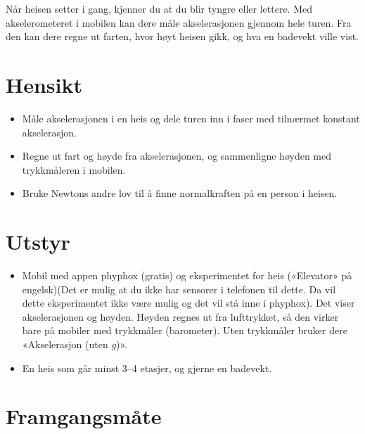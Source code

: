 \documentclass[11pt]{article}
\begin{document}

Når heisen setter i gang, kjenner du at du blir tyngre eller lettere. Med akselerometeret i mobilen kan dere måle akselerasjonen gjennom hele turen. Fra den kan dere regne ut farten, hvor høyt heisen gikk, og hva en badevekt ville vist.

\section*{Hensikt}

\begin{itemize}
\item Måle akselerasjonen i en heis og dele turen inn i faser med tilnærmet konstant akselerasjon.
\item Regne ut fart og høyde fra akselerasjonen, og sammenligne høyden med trykkmåleren i mobilen.
\item Bruke Newtons andre lov til å finne normalkraften på en person i heisen.
\end{itemize}

\section*{Utstyr}

\begin{itemize}
\item Mobil med appen phyphox (gratis) og eksperimentet for heis («Elevator» på engelsk)(Det er mulig at du ikke har sensorer i telefonen til dette. Da vil dette eksperimentet ikke være mulig og det vil stå inne i phyphox). Det viser akselerasjonen og høyden. Høyden regnes ut fra lufttrykket, så den virker bare på mobiler med trykkmåler (barometer). Uten trykkmåler bruker dere «Akselerasjon (uten $g$)».
\item En heis som går minst 3–4 etasjer, og gjerne en badevekt.
\end{itemize}

\section*{Framgangsmåte}
\end{document}
